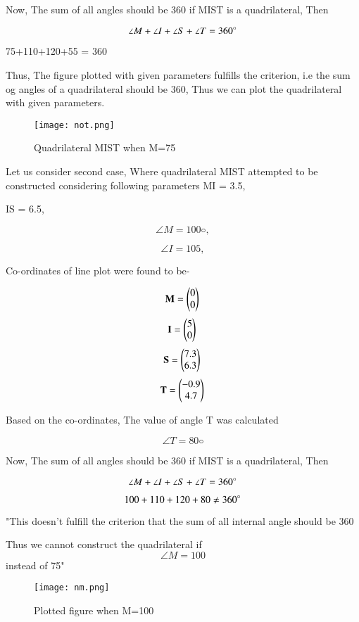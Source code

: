 \documentclass[journal,12pt,twocolumn]{IEEEtran}
\begin{document}
Now, The sum of all angles should be 360\degree
if MIST is a quadrilateral,
Then

$$\angle M+\angle I+\angle S+\angle T= 360\degree$$

75+110+120+55 = 360\degree

Thus, The figure plotted with given parameters fulfills the criterion, i.e the sum og angles of a quadrilateral should be 360\degree , Thus we can plot the quadrilateral with given parameters.

\begin{figure}[h!]
\texttt{[image: not.png]}
  \caption{Quadrilateral MIST when \angle M=75}
  \label{fig:Quadrilateral MIST}
\end{figure}

Let us consider second case, Where quadrilateral MIST attempted to be constructed considering following parameters
MI = 3.5, 

IS = 6.5,

$$\angle M = 100◦,$$

$$\angle I = 105,$$

Co-ordinates of line plot were found to be-

$$\mathbf {M} =\begin{pmatrix}0\\0\end{pmatrix}\\$$
$$\mathbf {I} =\begin{pmatrix}5\\0\end{pmatrix}\\$$
$$\mathbf {S} =\begin{pmatrix}7.3\\6.3\end{pmatrix}\\$$
$$\mathbf {T} =\begin{pmatrix}-0.9\\4.7\end{pmatrix}\\$$

Based on the co-ordinates, The value of angle T was calculated

$$\angle T = 80◦$$

Now, The sum of all angles should be 360\degree
if MIST is a quadrilateral, Then

$$\angle M+\angle I+\angle S+\angle T= 360\degree$$

$$100+110+120+80 \neq 360\degree$$

"This doesn't fulfill the criterion that the sum of all internal angle should be 360\degree

Thus we cannot construct the quadrilateral if $$\angle M= 100$$ instead of 75\degree "

\begin{figure}[h!]
\texttt{[image: nm.png]}
  \caption{Plotted figure when \angle M=100}
  \label{fig:Plotted figure when \angle M=100}
\end{figure}
\end{document}
